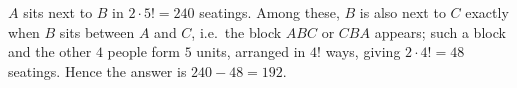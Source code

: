 $A$ sits next to $B$ in $2\cdot5!=240$ seatings. Among these, $B$ is also next to $C$ exactly when $B$ sits between $A$ and $C$, i.e.\ the block $ABC$ or $CBA$ appears; such a block and the other $4$ people form $5$ units, arranged in $4!$ ways, giving $2\cdot4!=48$ seatings. Hence the answer is $240-48=\boxed{192}$.

